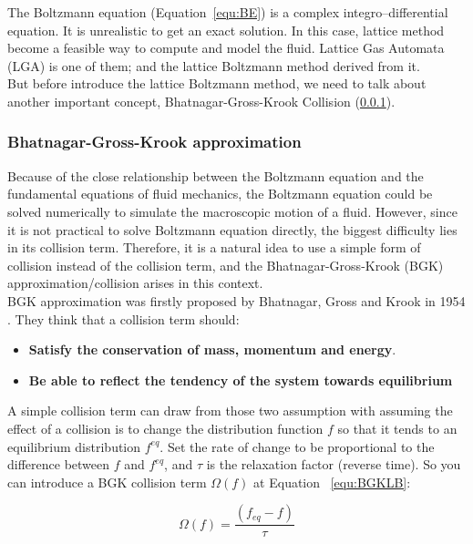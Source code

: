 The Boltzmann equation (Equation~\ref{equ:BE}) is a complex integro–differential equation. It is unrealistic to get an exact solution. In this case, lattice method become a feasible way to compute and model the fluid. Lattice Gas Automata (LGA) \cite{frisch1986lattice} is one of them; and the lattice Boltzmann method derived from it.\\

But before introduce the lattice Boltzmann method, we need to talk about another important concept, Bhatnagar-Gross-Krook Collision (\ref{sec:BKG}).\\

\subsubsection{Bhatnagar-Gross-Krook approximation} \label{sec:BKG}
Because of the close relationship between the Boltzmann equation and the fundamental equations of fluid mechanics, the Boltzmann equation could be solved numerically to simulate the macroscopic motion of a fluid. However, since it is not practical to solve Boltzmann equation directly, the biggest difficulty lies in its collision term. Therefore, it is a natural idea to use a simple form of collision instead of the collision term, and the Bhatnagar-Gross-Krook (BGK) approximation/collision \cite{bgk} arises in this context.\\

BGK approximation was firstly proposed by Bhatnagar, Gross and Krook in 1954 \cite{bgk}. They think that a collision term should: 

\begin{itemize}
\item \textbf{Satisfy the conservation of mass, momentum and energy}. 

\item \textbf{Be able to reflect the tendency of the system towards equilibrium}
\end{itemize}

A simple collision term can draw from those two assumption with assuming the effect of a collision is to change the distribution function $f$ so that it tends to an equilibrium distribution $f^{eq}$. Set the rate of change to be proportional to the difference between $f$ and $f^{eq}$, and $\tau$ is the relaxation factor (reverse time). So you can introduce a BGK collision term $\Omega (f)$ at Equation ~\ref{equ:BGKLB}:

\begin{equation}
\label{equ:BGKLB}
    \Omega (f) = \frac{(f_{eq} - f)}{\tau}
\end{equation}

